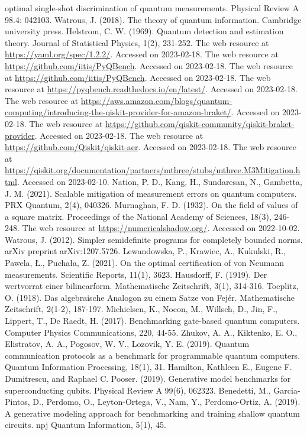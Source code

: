 \documentclass[preprint,12pt, a4paper, dvipsnames]{elsarticle}
\newcommand{\1}{{\rm 1\hspace{-0.9mm}l}}
\theoremstyle{definition}
\begin{document}
\begin{thebibliography}{00}
optimal single-shot discrimination of quantum measurements. Physical Review A
98.4: 042103.
 Watrous, J. (2018). The theory of quantum information. Cambridge university press.
 Helstrom, C. W. (1969). Quantum detection and estimation theory. Journal of Statistical Physics, 1(2), 231-252.
 The web resource at \url{https://yaml.org/spec/1.2.2/}. Accessed on 2023-02-18.
 The web resource at \url{https://github.com/iitis/PyQBench}. Accessed on 2023-02-18.
 The web resource at \url{https://github.com/iitis/PyQBench}. Accessed on 2023-02-18.
 The web resource at \url{https://pyqbench.readthedocs.io/en/latest/}. Accessed on 2023-02-18.
 The web resource at \url{https://aws.amazon.com/blogs/quantum-computing/introducing-the-qiskit-provider-for-amazon-braket/}. Accessed on 2023-02-18.
 The web resource at \url{https://github.com/qiskit-community/qiskit-braket-provider}. Accessed on 2023-02-18.
 The web resource at \url{https://github.com/Qiskit/qiskit-aer}. Accessed on 2023-02-18.
 The web resource at \url{https://qiskit.org/documentation/partners/mthree/stubs/mthree.M3Mitigation.html}. Accessed on 2023-02-10.
 Nation, P. D., Kang, H., Sundaresan, N.,  Gambetta, J. M. (2021). Scalable mitigation of measurement errors on quantum computers. PRX Quantum, 2(4), 040326.
 Murnaghan, F. D. (1932). On the field of values of a square matrix. Proceedings of the National Academy of Sciences, 18(3), 246-248.
 The web resource at \url{https://numericalshadow.org/}. Accessed on 2022-10-02.
 Watrous, J. (2012). Simpler semidefinite programs for completely bounded norms. arXiv preprint arXiv:1207.5726.
 Lewandowska, P., Krawiec, A., Kukulski, R., Pawela, Ł.,  Puchała, Z. (2021). On the optimal certification of von Neumann measurements. Scientific Reports, 11(1), 3623.
 Hausdorff, F. (1919). Der wertvorrat einer bilinearform. Mathematische Zeitschrift, 3(1), 314-316.
 Toeplitz, O. (1918). Das algebraische Analogon zu einem Satze von Fejér. Mathematische Zeitschrift, 2(1-2), 187-197.
 Michielsen, K., Nocon, M., Willsch, D., Jin, F., Lippert, T.,  De Raedt, H. (2017). Benchmarking gate-based quantum computers. Computer Physics Communications, 220, 44-55.
 Zhukov, A. A., Kiktenko, E. O., Elistratov, A. A., Pogosov, W. V.,  Lozovik, Y. E. (2019). Quantum communication protocols as a benchmark for programmable quantum computers. Quantum Information Processing, 18(1), 31.
 Hamilton, Kathleen E., Eugene F. Dumitrescu,
and Raphael C. Pooser. (2019). Generative model benchmarks for superconducting
qubits. Physical Review A 99(6), 062323.
 Benedetti, M., Garcia-Pintos, D., Perdomo, O., Leyton-Ortega, V., Nam, Y., Perdomo-Ortiz, A. (2019). A generative modeling approach for benchmarking and training shallow quantum circuits. npj Quantum Information, 5(1), 45.


\end{thebibliography}
\end{document}
